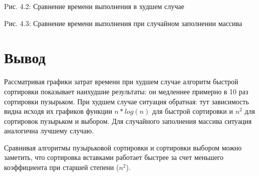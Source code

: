 \begin{center}
	Pис. 4.2: Сравнение времени выполнения в худшем случае
\end{center}



\begin{center}
	Pис. 4.3: Сравнение времени выполнения при случайном заполнении массива
\end{center}



\section*{Вывод}

Рассматривая графики затрат времени при худшем случае алгоритм быстрой сортировки показывает наихудшие результаты: он медленнее примерно в 10 раз сортировки пузырьком. При худшем случае ситуация обратная: тут зависимость видна исходя их графиков функции $n*log(n)$ для быстрой сортировки и $n^2$ для сортировок пузырьком и выбором. Для случайного заполнения массива ситуация аналогична лучшему случаю.

Сравнивая алгоритмы пузырьковой сортировки и сортировки выбором можно заметить, что сортировка вставками работает быстрее за счет меньшего коэффициента при старшей степени ($n^2$).










	
	









